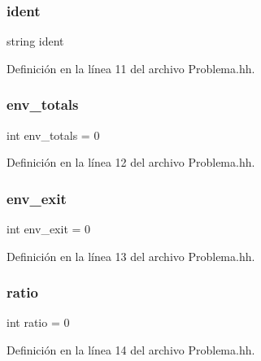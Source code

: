 \subsubsection{\texorpdfstring{ident}{ident}}
{\footnotesize\ttfamily string ident}



Definición en la línea 11 del archivo Problema.\+hh.

\mbox{\label{_problema_8hh_a73b5d92e248a4b095421d63395b1462d}} 
\subsubsection{\texorpdfstring{env\+\_\+totals}{env\_totals}}
{\footnotesize\ttfamily int env\+\_\+totals = 0}



Definición en la línea 12 del archivo Problema.\+hh.

\mbox{\label{_problema_8hh_a3951342fc1aa6b676dd35ecce4239f88}} 
\subsubsection{\texorpdfstring{env\+\_\+exit}{env\_exit}}
{\footnotesize\ttfamily int env\+\_\+exit = 0}



Definición en la línea 13 del archivo Problema.\+hh.

\mbox{\label{_problema_8hh_a79e45999bba256f0615955bc9b13f414}} 
\subsubsection{\texorpdfstring{ratio}{ratio}}
{\footnotesize\ttfamily int ratio = 0}



Definición en la línea 14 del archivo Problema.\+hh.

